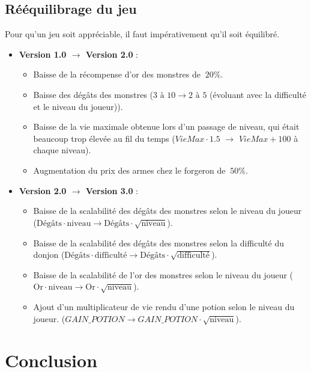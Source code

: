\documentclass{article}
\begin{document}
\subsection{Rééquilibrage du jeu}
Pour qu'un jeu soit appréciable, il faut impérativement qu'il soit équilibré.

\begin{itemize}

  \item \textbf{Version 1.0 $\rightarrow$ Version 2.0} :
  \begin{itemize}
    \item Baisse de la récompense d'or des monstres de $~20\%$.
    \item Baisse des dégâts des monstres ($3 \text{ à } 10 \to 2 \text{ à } 5$ (évoluant avec la difficulté et le niveau du joueur)).
    \item Baisse de la vie maximale obtenue lors d'un passage de niveau, qui était beaucoup trop élevée au fil du temps ($VieMax \cdot 1.5$ $\to$ $VieMax + 100$ à chaque niveau).
    \item Augmentation du prix des armes chez le forgeron de $~50\%$.
  \end{itemize}

  \item \textbf{Version 2.0 $\rightarrow$ Version 3.0} :
  \begin{itemize}
    \item Baisse de la scalabilité des dégâts des monstres selon le niveau du joueur ($\text{Dégâts} \cdot \text{niveau} \to \text{Dégâts} \cdot \sqrt{\text{niveau}}$).
    \item Baisse de la scalabilité des dégâts des monstres selon la difficulté du donjon ($\text{Dégâts} \cdot \text{difficulté} \to \text{Dégâts} \cdot \sqrt{\text{difficulté}}$).
    \item Baisse de la scalabilité de l'or des monstres selon le niveau du joueur ($\text{Or} \cdot \text{niveau} \to \text{Or} \cdot \sqrt{\text{niveau}}$).
    \item Ajout d'un multiplicateur de vie rendu d'une potion selon le niveau du joueur. ($GAIN\_POTION \to GAIN\_POTION \cdot \sqrt{\text{niveau}}$).
  \end{itemize}

\end{itemize}

\section{Conclusion}
\end{document}
